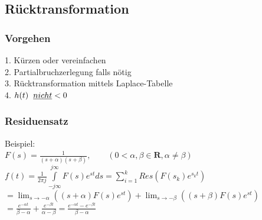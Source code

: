 \newpage
\renewcommand{\arraystretch}{\arraystretchOriginal}		
	\subsection{Rücktransformation}
		\subsubsection{Vorgehen}
				1. Kürzen oder vereinfachen \\
				2. Partialbruchzerlegung falls nötig \\
				3. Rücktransformation mittels Laplace-Tabelle \\
				4. $h(t)\hspace{0.2cm}\underline{nicht} < 0$ \\
			
		\subsubsection{Residuensatz}
			Beispiel:\\
			$F(s) = \frac{1}{(s+\alpha)(s+\beta)}, \qquad (0 < \alpha,\beta \in \mathbf{R}, \alpha \neq \beta)$\\
			$f(t) = \frac{1}{2\pi j} \int\limits_{-j\infty}^{j\infty} F(s)e^{st} ds = \sum\limits_{i=1}^k Res(F(s_k)e^{s_kt})$\\
			$=\lim_{s \to -\alpha} ((s+\alpha)F(s)e^{st}) + \lim_{s \to -\beta}((s+\beta)F(s)e^{st})$\\
			$=\frac{e^{-\alpha t}}{\beta - \alpha} + \frac{e^{-\beta t}}{\alpha - \beta} = \frac{e^{-\alpha t}-e^{-\beta t}}{\beta - \alpha}$
			
			
